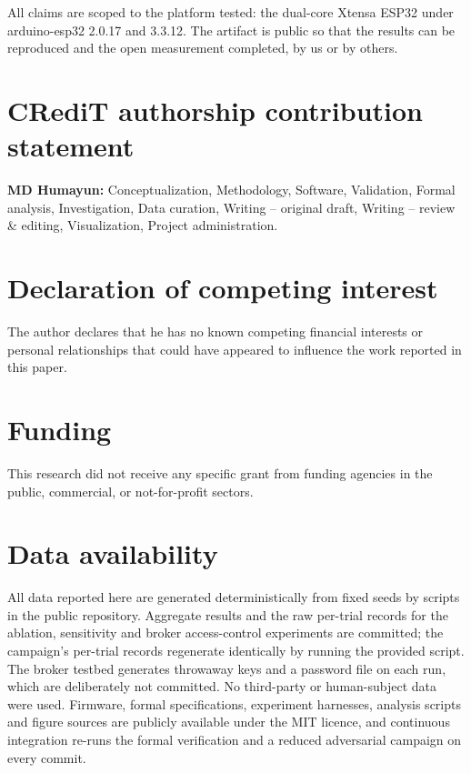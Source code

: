 All claims are scoped to the platform tested: the dual-core Xtensa ESP32 under arduino-esp32
2.0.17 and 3.3.12. The artifact is public so that the results can be reproduced and the open
measurement completed, by us or by others.

%

\section*{CRediT authorship contribution statement}

\noindent\textbf{MD Humayun:} Conceptualization, Methodology, Software, Validation, Formal
analysis, Investigation, Data curation, Writing -- original draft, Writing -- review \&
editing, Visualization, Project administration.

\section*{Declaration of competing interest}

\noindent The author declares that he has no known competing financial interests or personal
relationships that could have appeared to influence the work reported in this paper.

\section*{Funding}

\noindent This research did not receive any specific grant from funding agencies in the public,
commercial, or not-for-profit sectors.

\section*{Data availability}

\noindent All data reported here are generated deterministically from fixed seeds by scripts in
the public repository. Aggregate results and the raw per-trial records for the ablation,
sensitivity and broker access-control experiments are committed; the campaign's per-trial
records regenerate identically by running the provided script. The broker testbed generates
throwaway keys and a password file on each run, which are deliberately not committed. No
third-party or human-subject data were used. Firmware, formal specifications, experiment
harnesses, analysis scripts and figure sources are publicly available under the MIT licence,
and continuous integration re-runs the formal verification and a reduced adversarial campaign
on every commit.

